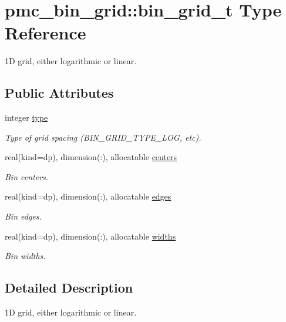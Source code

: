 \hypertarget{structpmc__bin__grid_1_1bin__grid__t}{}\section{pmc\+\_\+bin\+\_\+grid\+:\+:bin\+\_\+grid\+\_\+t Type Reference}
\label{structpmc__bin__grid_1_1bin__grid__t}


1D grid, either logarithmic or linear.  


\subsection*{Public Attributes}
\begin{DoxyCompactItemize}
\item 
integer \mbox{\hyperlink{structpmc__bin__grid_1_1bin__grid__t_a45f1d8ea9689e3db3f872d72c9ec35d8}{type}}
\begin{DoxyCompactList}\small\item\em Type of grid spacing (B\+I\+N\+\_\+\+G\+R\+I\+D\+\_\+\+T\+Y\+P\+E\+\_\+\+L\+OG, etc). \end{DoxyCompactList}\item 
real(kind=dp), dimension(\+:), allocatable \mbox{\hyperlink{structpmc__bin__grid_1_1bin__grid__t_a314c495872c7e6a83b2eb29ad5c79465}{centers}}
\begin{DoxyCompactList}\small\item\em Bin centers. \end{DoxyCompactList}\item 
real(kind=dp), dimension(\+:), allocatable \mbox{\hyperlink{structpmc__bin__grid_1_1bin__grid__t_a58dccaaaebf7a11a60cf46848e39a7a8}{edges}}
\begin{DoxyCompactList}\small\item\em Bin edges. \end{DoxyCompactList}\item 
real(kind=dp), dimension(\+:), allocatable \mbox{\hyperlink{structpmc__bin__grid_1_1bin__grid__t_a28a0f3561d58a8277b506bb3cb67616c}{widths}}
\begin{DoxyCompactList}\small\item\em Bin widths. \end{DoxyCompactList}\end{DoxyCompactItemize}


\subsection{Detailed Description}
1D grid, either logarithmic or linear. 

